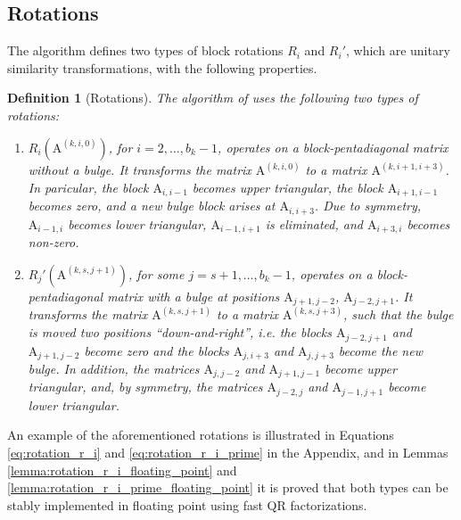 \documentclass{article}
\newtheorem{definition}{Definition}[section]
\newcommand\matA{\boldsymbol{\mathrm{A}}}
\begin{document}
\subsection{Rotations}
The algorithm defines two types of block rotations $R_i$ and $R_i'$, which are unitary similarity transformations, with the following properties.
\begin{definition}[Rotations]
    The algorithm of \cite{schonhage1972unitare} uses the following two types of rotations:
    \begin{enumerate}
    \item $R_i(\matA^{(k,i,0)})$, for $i=2,\ldots,b_k-1$, operates on a block-pentadiagonal matrix without a bulge. It transforms the matrix $\matA^{(k,i,0)}$ to a matrix $\matA^{(k,i+1,i+3)}$. In paricular, the block $\matA_{i,i-1}$ becomes upper triangular, the block $\matA_{i+1,i-1}$ becomes zero, and a new bulge block arises at $\matA_{i,i+3}$. Due to symmetry, $\matA_{i-1,i}$ becomes lower triangular, $\matA_{i-1,i+1}$ is eliminated, and $\matA_{i+3,i}$ becomes non-zero. 
    \item $R_j'(\matA^{(k,s,j+1)})$, for some $j=s+1,\ldots,b_k-1$, operates on a block-pentadiagonal matrix with a bulge at positions $\matA_{j+1,j-2}$, $\matA_{j-2,j+1}$. It transforms the matrix $\matA^{(k,s,j+1)}$ to a matrix $\matA^{(k,s,j+3)}$, such that the bulge is moved two positions ``down-and-right'', i.e. the blocks $\matA_{j-2,j+1}$ and  $\matA_{j+1,j-2}$ become zero and the blocks $\matA_{j,i+3}$ and $\matA_{j,j+3}$ become the new bulge. In addition, the matrices $\matA_{j,j-2}$ and $\matA_{j+1,j-1}$ become upper triangular, and, by symmetry, the matrices $\matA_{j-2,j}$ and $\matA_{j-1,j+1}$ become lower triangular.
\end{enumerate}
\end{definition}

An example of the aforementioned rotations is illustrated in Equations \eqref{eq:rotation_r_i} and \eqref{eq:rotation_r_i_prime} in the Appendix, and in Lemmas \ref{lemma:rotation_r_i_floating_point} and \ref{lemma:rotation_r_i_prime_floating_point} it is proved that both types can be stably implemented in floating point using fast QR factorizations.
\end{document}

